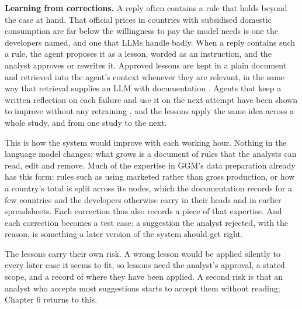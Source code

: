 \textbf{Learning from corrections.} A reply often contains a rule that holds beyond the case at hand.
That official prices in countries with subsidised domestic consumption are far below the willingness to pay the model needs is one the developers named, and one that LLMs handle badly.
When a reply contains such a rule, the agent proposes it as a lesson, worded as an instruction, and the analyst approves or rewrites it.
Approved lessons are kept in a plain document and retrieved into the agent's context whenever they are relevant, in the same way that retrieval supplies an LLM with documentation \citep{lewis2020retrieval}.
Agents that keep a written reflection on each failure and use it on the next attempt have been shown to improve without any retraining \citep{shinn2023reflexion}, and the lessons apply the same idea across a whole study, and from one study to the next.

This is how the system would improve with each working hour.
Nothing in the language model changes; what grows is a document of rules that the analysts can read, edit and remove.
Much of the expertise in GGM's data preparation already has this form: rules such as using marketed rather than gross production, or how a country's total is split across its nodes, which the documentation records for a few countries \citep[pp.~24--25]{egging2019global} and the developers otherwise carry in their heads and in earlier spreadsheets.
Each correction thus also records a piece of that expertise.
And each correction becomes a test case: a suggestion the analyst rejected, with the reason, is something a later version of the system should get right.

The lessons carry their own risk.
A wrong lesson would be applied silently to every later case it seems to fit, so lessons need the analyst's approval, a stated scope, and a record of where they have been applied.
A second risk is that an analyst who accepts most suggestions starts to accept them without reading; Chapter 6 returns to this.
